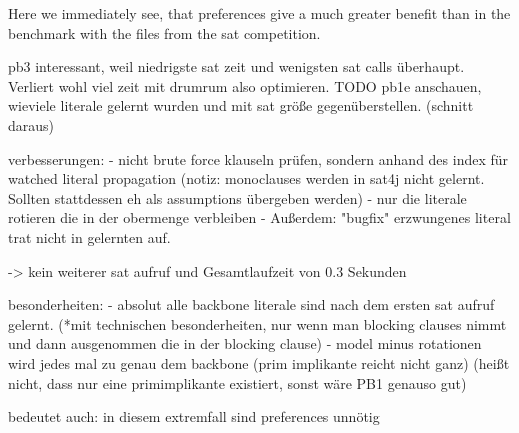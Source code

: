 Here we immediately see, that preferences give a much greater benefit than in the benchmark with the files from the sat competition.

pb3 interessant, weil niedrigste sat zeit und wenigsten sat calls überhaupt. Verliert wohl viel zeit mit drumrum also optimieren.
TODO pb1e anschauen, wieviele literale gelernt wurden und mit sat größe gegenüberstellen. (schnitt daraus)

verbesserungen:
- nicht brute force klauseln prüfen, sondern anhand des index für watched literal propagation (notiz: monoclauses werden in sat4j nicht gelernt. Sollten stattdessen eh als assumptions übergeben werden)
- nur die literale rotieren die in der obermenge verbleiben
- Außerdem: "bugfix" erzwungenes literal trat nicht in gelernten auf.

-> kein weiterer sat aufruf und Gesamtlaufzeit von 0.3 Sekunden

besonderheiten: 
- absolut alle backbone literale sind nach dem ersten sat aufruf gelernt. (*mit technischen besonderheiten, nur wenn man blocking clauses nimmt und dann ausgenommen die in der blocking clause)
- model minus rotationen wird jedes mal zu genau dem backbone (prim implikante reicht nicht ganz) (heißt nicht, dass nur eine primimplikante existiert, sonst wäre PB1 genauso gut) 

bedeutet auch: in diesem extremfall sind preferences unnötig


